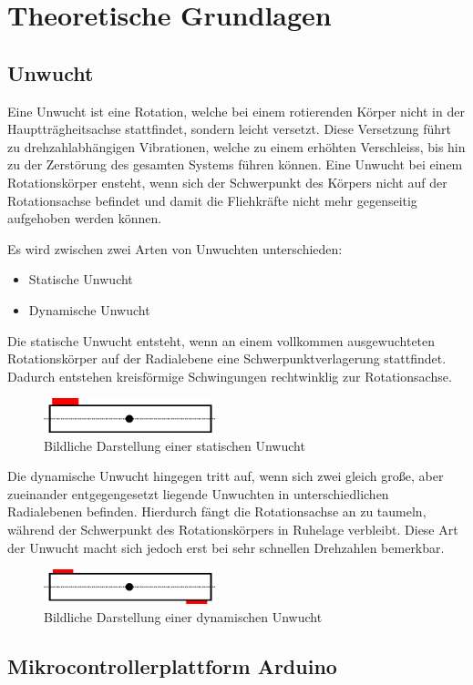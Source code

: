 
\chapter{Theoretische Grundlagen}

\section{Unwucht}

Eine Unwucht ist eine Rotation, welche bei einem rotierenden Körper nicht in der Hauptträgheitsachse stattfindet, sondern leicht versetzt.
Diese Versetzung führt zu drehzahlabhängigen Vibrationen, welche zu einem erhöhten Verschleiss, bis hin zu der Zerstörung des gesamten Systems führen können.
Eine Unwucht bei einem Rotationskörper ensteht, wenn sich der Schwerpunkt des Körpers nicht auf der Rotationsachse befindet und damit die Fliehkräfte nicht mehr gegenseitig aufgehoben werden können.

Es wird zwischen zwei Arten von Unwuchten unterschieden:
\begin{itemize}
	\item Statische Unwucht
	\item Dynamische Unwucht
\end{itemize}

Die statische Unwucht entsteht, wenn an einem vollkommen ausgewuchteten Rotationskörper auf der Radialebene eine Schwerpunktverlagerung stattfindet.
Dadurch entstehen kreisförmige Schwingungen rechtwinklig zur Rotationsachse.
\begin{figure}[H]
	\centering
	\includegraphics[width=5cm]{images/chapter/02/static_imbalance.png}
	\caption{Bildliche Darstellung einer statischen Unwucht}
\end{figure}
Die dynamische Unwucht hingegen tritt auf, wenn sich zwei gleich große, aber zueinander entgegengesetzt liegende Unwuchten in unterschiedlichen Radialebenen befinden.
Hierdurch fängt die Rotationsachse an zu taumeln, während der Schwerpunkt des Rotationskörpers in Ruhelage verbleibt.
Diese Art der Unwucht macht sich jedoch erst bei sehr schnellen Drehzahlen bemerkbar.
\begin{figure}[H]
	\centering
	\includegraphics[width=5cm]{images/chapter/02/dynamic_imbalance.png}
	\caption{Bildliche Darstellung einer dynamischen Unwucht}
\end{figure}

\section{Mikrocontrollerplattform Arduino}

